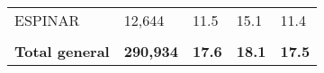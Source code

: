 \begin{tabular}{lllll}
	\cellcolor[HTML]{FF5050}ESPINAR                                & 12,644                                                                & 11.5                                                                             & 15.1                                                                        & 11.4                                                                                \\
	&                                                                       &                                                                                  &                                                                             &                                                                                     \\
	\rowcolor[HTML]{DDEBF7} 
	\textbf{Total   general}                                       & \textbf{290,934}                                                      & \textbf{17.6}                                                                    & \textbf{18.1}                                                               & \textbf{17.5}                                                                      
\end{tabular}